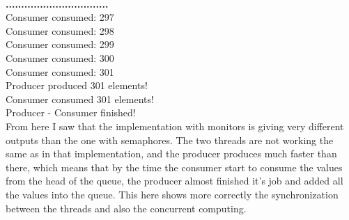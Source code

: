 \documentclass[14pt]{article}
\begin{document}
\\\textbf{.................................}
\\Consumer consumed: 297
\\Consumer consumed: 298
\\Consumer consumed: 299
\\Consumer consumed: 300
\\Consumer consumed: 301
\\Producer produced 301 elements!
\\Consumer consumed 301 elements!
\\Producer - Consumer finished!
\vspace{2.5 mm}
\\From here I saw that the implementation with monitors is giving very different outputs than the one with semaphores. The two threads are not working the same as in that implementation, and the producer produces much faster than there, which means that by the time the consumer start to consume the values from the head of the queue, the producer almost finished it's job and added all the values into the queue. This here shows more correctly the synchronization between the threads and also the concurrent computing.
\end{document}
